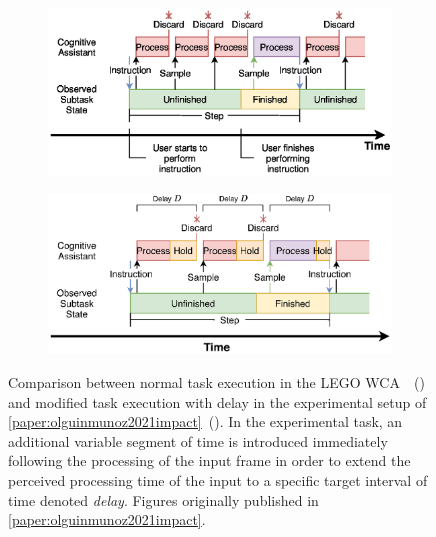 \begin{figure}[tb]
    \centering
    \begin{subfigure}[t]{.45\textwidth}
        \centering
        \includegraphics[width=\textwidth]{publications/2021ImpactDelayedResponse/Fig4a}
        \caption{}\label{sfig:regularwcaexec}
    \end{subfigure}%
    \hfill%
    \begin{subfigure}[t]{.45\textwidth}
        \centering
        \includegraphics[width=\textwidth]{publications/2021ImpactDelayedResponse/Fig4b}
        \caption{}\label{sfig:delaywcaexec}
    \end{subfigure}
    \caption{%
        Comparison between normal task execution in the LEGO \gls{WCA}~\cite{chen2015early}~() and modified task execution with delay in the experimental setup of \cref{paper:olguinmunoz2021impact}~().
        In the experimental task, an additional variable segment of time is introduced immediately following the processing of the input frame in order to extend the perceived processing time of the input to a specific target interval of time denoted \emph{delay}.
        Figures originally published in \cref{paper:olguinmunoz2021impact}.
    }\label{fig:regularwca-vs-delaywca}
\end{figure}

